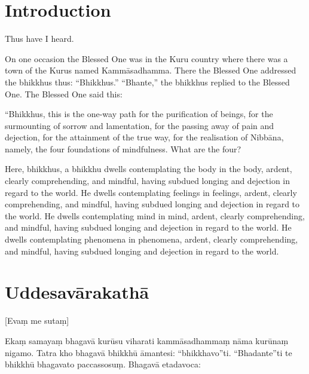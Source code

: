 \newcommand\englishPage{%
  \clearpage%
  \englishText%
}

\newcommand\paliPage{%
  \clearpage%
  \paliText%
}

\renewcommand{\englishTitle}{The Foundations of Mindfulness}
\renewcommand{\paliTitle}{Mahāsatipaṭṭhāna Sutta}

\englishPage
\chapter{Introduction}

Thus have I heard.

On one occasion the Blessed One was in the Kuru country where there was a town
of the Kurus named Kammāsadhamma. There the Blessed One addressed the bhikkhus
thus: “Bhikkhus.” “Bhante,” the bhikkhus replied to the Blessed One. The Blessed
One said this:

“Bhikkhus, this is the one-way path for the purification of beings, for the
surmounting of sorrow and lamentation, for the passing away of pain and
dejection, for the attainment of the true way, for the realisation of Nibbāna,
namely, the four foundations of mindfulness. What are the four?

Here, bhikkhus, a bhikkhu dwells contemplating the body in the body, ardent,
clearly comprehending, and mindful, having subdued longing and dejection in
regard to the world. He dwells contemplating feelings in feelings, ardent,
clearly comprehending, and mindful, having subdued longing and dejection in
regard to the world. He dwells contemplating mind in mind, ardent, clearly
comprehending, and mindful, having subdued longing and dejection in regard to
the world. He dwells contemplating phenomena in phenomena, ardent, clearly
comprehending, and mindful, having subdued longing and dejection in regard to
the world.


\paliPage
\chapter*{Uddesavārakathā}

[Evaṃ me sutaṃ]

Ekaṃ samayaṃ bhagavā kurūsu viharati kammāsadhammaṃ nāma kurūnaṃ nigamo. Tatra
kho bhagavā bhikkhū āmantesi: “bhikkhavo”ti. “Bhadante”ti te bhikkhū bhagavato
paccassosuṃ. Bhagavā etadavoca:


